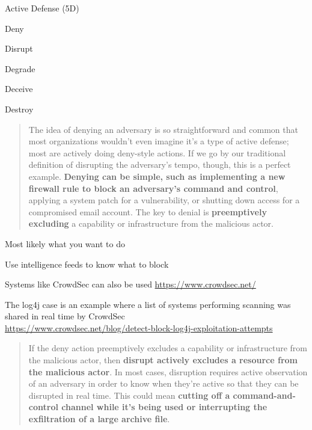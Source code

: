 \documentclass[Screen16to9,17pt]{foils}
\begin{document}
Active Defense (5D)
\begin{list2}
\item Deny
\item Disrupt
\item Degrade
\item Deceive
\item Destroy
\end{list2}


\begin{quote}
The idea of denying an adversary is so straightforward and common that most organizations wouldn’t even imagine it’s a type of active defense; most are actively doing deny-style actions. If we go by our traditional definition of disrupting the adversary’s tempo, though, this is a perfect example. {\bf Denying can be simple, such as implementing a new firewall rule to block an adversary’s command and control}, applying a
system patch for a vulnerability, or shutting down access for a compromised email
account. The key to denial is {\bf preemptively excluding} a capability or infrastructure from
the malicious actor.
\end{quote}

\begin{list2}
\item Most likely what you want to do
\item Use intelligence feeds to know what to block
\item Systems like CrowdSec can also be used \url{https://www.crowdsec.net/}
\item The log4j case is an example where a list of systems performing scanning was shared in real time by CrowdSec\\
\url{https://www.crowdsec.net/blog/detect-block-log4j-exploitation-attempts}

\end{list2}




\begin{quote}
If the deny action preemptively excludes a capability or infrastructure from the
malicious actor, then {\bf disrupt actively excludes a resource from the malicious actor}. In most cases, disruption requires active observation of an adversary in order to know when they’re active so that they can be disrupted in real time. This could mean
{\bf cutting off a command-and-control channel while it’s being used or interrupting the
exfiltration of a large archive file}.
\end{quote}
\end{document}
